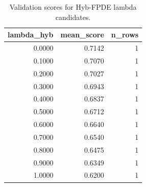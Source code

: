 \begin{table}[t]
\caption{Validation scores for Hyb-FPDE lambda candidates.}
\label{tab:lambda_distribution_computed}
\centering
\begin{tabular}{rrr}
\toprule
lambda\_hyb & mean\_score & n\_rows \\
\midrule
0.0000 & 0.7142 & 1 \\
0.1000 & 0.7070 & 1 \\
0.2000 & 0.7027 & 1 \\
0.3000 & 0.6943 & 1 \\
0.4000 & 0.6837 & 1 \\
0.5000 & 0.6712 & 1 \\
0.6000 & 0.6640 & 1 \\
0.7000 & 0.6540 & 1 \\
0.8000 & 0.6475 & 1 \\
0.9000 & 0.6349 & 1 \\
1.0000 & 0.6200 & 1 \\
\bottomrule
\end{tabular}

\end{table}
